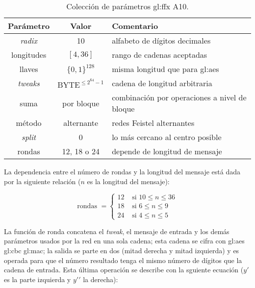 \begin{table}[H]
  \centering
  \begin{tabular}{| c | c | l |}
    \hline
    \textbf{Parámetro} &
    \textbf{Valor} &
    \textbf{Comentario} \\
    \hline

    \textit{radix}  & 10 & alfabeto de dígitos decimales \\
    \hline

    longitudes & $ [ 4, 36 ] $ & rango de cadenas aceptadas \\
    \hline

    llaves & $ \{ 0, 1\}^{128} $ & misma longitud que para \gls{gl:aes} \\
    \hline

    \textit{tweaks} & $ \text{BYTE}^{\leq 2^{64} - 1} $ & cadena de longitud
    arbitraria \\
    \hline

    suma & por bloque & combinación por operaciones a nivel de bloque \\
    \hline

    método & alternante & redes Feistel alternantes \\
    \hline

    \textit{split} & 0 & lo más cercano al centro posible \\
    \hline

    rondas & 12, 18 o 24 & depende de longitud de mensaje \\
    \hline

  \end{tabular}
  \caption{Colección de parámetros \gls{gl:ffx} A10.}
  \label{ffx_a10}
\end{table}

La dependencia entre el número de rondas y la longitud del mensaje está dada
por la siguiente relación ($ n $ es la longitud del mensaje):

\begin{equation}
  \text{rondas } =
  \begin{cases}
    12 & \text{ si } 10 \leq n \leq 36 \\
    18 & \text{ si } 6  \leq n \leq 9 \\
    24 & \text{ si } 4  \leq n \leq 5
  \end{cases}
\end{equation}

La función de ronda concatena el \textit{tweak}, el mensaje de entrada y los
demás parámetros usados por la red en una sola cadena; esta cadena se cifra con
\gls{gl:aes} \gls{gl:cbc} \gls{gl:mac}; la salida se parte en dos (mitad derecha
y mitad izquierda) y es operada para que el número resultado tenga el mismo
número de dígitos que la cadena de entrada. Esta última operación se describe
con la sguiente ecuación ($y\prime$ es la parte izquierda y $ y\prime\prime $
la derecha):

